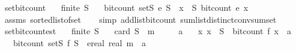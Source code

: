 \begin{isabellebody}
\endisatagproof
{\isafoldproof}%
%
\isadelimproof
\isanewline
%
\endisadelimproof
\isanewline
{}\isamarkupfalse%
\ set{\isacharunderscore}{\kern0pt}bit{\isacharunderscore}{\kern0pt}count{\isacharcolon}{\kern0pt}\isanewline
\ \ \ {\isachardoublequoteopen}finite\ S{\isachardoublequoteclose}\isanewline
\ \ \ {\isachardoublequoteopen}bit{\isacharunderscore}{\kern0pt}count\ {\isacharparenleft}{\kern0pt}set\isactrlsub S\ e\ S{\isacharparenright}{\kern0pt}\ {\isacharequal}{\kern0pt}\ {\isacharparenleft}{\kern0pt}{\isasymSum}x\ {\isasymin}\ S{\isachardot}{\kern0pt}\ bit{\isacharunderscore}{\kern0pt}count\ {\isacharparenleft}{\kern0pt}e\ x{\isacharparenright}{\kern0pt}{\isacharplus}{\kern0pt}{}{\isacharparenright}{\kern0pt}{\isacharplus}{\kern0pt}{}{\isachardoublequoteclose}\isanewline
%
\isadelimproof
\ \ %
\endisadelimproof
%
\isatagproof
{}\isamarkupfalse%
\ assms\ sorted{\isacharunderscore}{\kern0pt}list{\isacharunderscore}{\kern0pt}of{\isacharunderscore}{\kern0pt}set\isanewline
\ \ \isamarkupfalse%
\ {\isacharparenleft}{\kern0pt}simp\ add{\isacharcolon}{\kern0pt}list{\isacharunderscore}{\kern0pt}bit{\isacharunderscore}{\kern0pt}count\ sum{\isacharunderscore}{\kern0pt}list{\isacharunderscore}{\kern0pt}distinct{\isacharunderscore}{\kern0pt}conv{\isacharunderscore}{\kern0pt}sum{\isacharunderscore}{\kern0pt}set{\isacharparenright}{\kern0pt}%
\endisatagproof
{\isafoldproof}%
%
\isadelimproof
\isanewline
%
\endisadelimproof
\isanewline
{}\isamarkupfalse%
\ set{\isacharunderscore}{\kern0pt}bit{\isacharunderscore}{\kern0pt}count{\isacharunderscore}{\kern0pt}est{\isacharcolon}{\kern0pt}\isanewline
\ \ \ {\isachardoublequoteopen}finite\ S{\isachardoublequoteclose}\isanewline
\ \ \ {\isachardoublequoteopen}card\ S\ {\isasymle}\ m{\isachardoublequoteclose}\isanewline
\ \ \ {\isachardoublequoteopen}{}\ {\isasymle}\ a{\isachardoublequoteclose}\isanewline
\ \ \ {\isachardoublequoteopen}{\isasymAnd}x{\isachardot}{\kern0pt}\ x\ {\isasymin}\ S\ {\isasymLongrightarrow}\ bit{\isacharunderscore}{\kern0pt}count\ {\isacharparenleft}{\kern0pt}f\ x{\isacharparenright}{\kern0pt}\ {\isasymle}\ a{\isachardoublequoteclose}\isanewline
\ \ \ {\isachardoublequoteopen}bit{\isacharunderscore}{\kern0pt}count\ {\isacharparenleft}{\kern0pt}set\isactrlsub S\ f\ S{\isacharparenright}{\kern0pt}\ {\isasymle}\ ereal\ {\isacharparenleft}{\kern0pt}real\ m{\isacharparenright}{\kern0pt}\ {\isacharasterisk}{\kern0pt}\ {\isacharparenleft}{\kern0pt}a{\isacharplus}{\kern0pt}{}{\isacharparenright}{\kern0pt}\ {\isacharplus}{\kern0pt}\ {}{\isachardoublequoteclose}\isanewline

\end{isabellebody}
